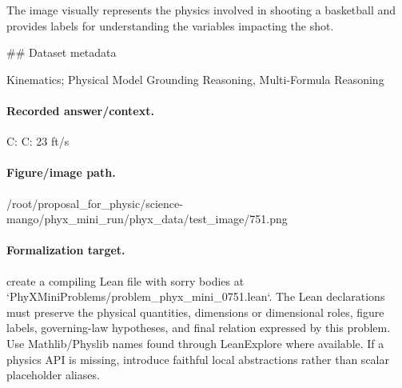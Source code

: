 The image visually represents the physics involved in shooting a basketball and provides labels for understanding the variables impacting the shot.

\#\# Dataset metadata

Kinematics; Physical Model Grounding Reasoning, Multi-Formula Reasoning

\paragraph{Recorded answer/context.}
C: C: 23 ft/s

\paragraph{Figure/image path.}
/root/proposal\_for\_physic/science-mango/phyx\_mini\_run/phyx\_data/test\_image/751.png

\paragraph{Formalization target.}
create a compiling Lean file with sorry bodies at `PhyXMiniProblems/problem\_phyx\_mini\_0751.lean`. The Lean declarations must preserve the physical quantities, dimensions or dimensional roles, figure labels, governing-law hypotheses, and final relation expressed by this problem.
Use Mathlib/Physlib names found through LeanExplore where available. If a physics API is missing, introduce faithful local abstractions rather than scalar placeholder aliases.

